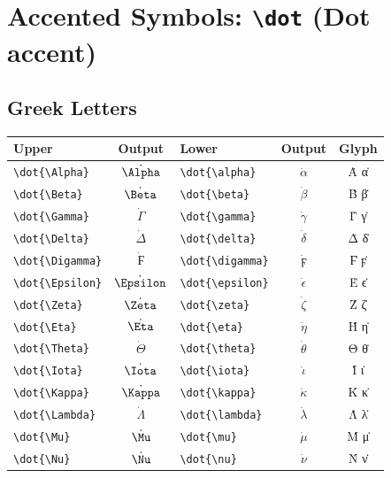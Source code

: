 \documentclass[12pt,a4paper]{article}
\begin{document}
\section*{Accented Symbols: \texttt{\textbackslash dot} (Dot accent)}

\subsection*{Greek Letters}
\begin{longtable}{|l|c|l|c|c|}
\hline
\textbf{Upper}           & \textbf{Output}  & \textbf{Lower}           & \textbf{Output}     & \textbf{Glyph} \\
\hline
\verb|\dot{\Alpha}|      & $\dot{\Alpha}$   & \verb|\dot{\alpha}|      & $\dot{\alpha}$      & Α̇ α̇ \\
\verb|\dot{\Beta}|       & $\dot{\Beta}$    & \verb|\dot{\beta}|       & $\dot{\beta}$       & Β̇ β̇ \\
\verb|\dot{\Gamma}|      & $\dot{\Gamma}$   & \verb|\dot{\gamma}|      & $\dot{\gamma}$      & Γ̇ γ̇ \\
\verb|\dot{\Delta}|      & $\dot{\Delta}$   & \verb|\dot{\delta}|      & $\dot{\delta}$      & Δ̇ δ̇ \\
\verb|\dot{\Digamma}|    & $\dot{\Digamma}$ & \verb|\dot{\digamma}|    & $\dot{\digamma}$    & Ϝ̇ ϝ̇ \\
\verb|\dot{\Epsilon}|    & $\dot{\Epsilon}$ & \verb|\dot{\epsilon}|    & $\dot{\epsilon}$    & Ε̇ ϵ̇ \\
\verb|\dot{\Zeta}|       & $\dot{\Zeta}$    & \verb|\dot{\zeta}|       & $\dot{\zeta}$       & Ζ̇ ζ̇ \\
\verb|\dot{\Eta}|        & $\dot{\Eta}$     & \verb|\dot{\eta}|        & $\dot{\eta}$        & Η̇ η̇ \\
\verb|\dot{\Theta}|      & $\dot{\Theta}$   & \verb|\dot{\theta}|      & $\dot{\theta}$      & Θ̇ θ̇ \\
\verb|\dot{\Iota}|       & $\dot{\Iota}$    & \verb|\dot{\iota}|       & $\dot{\iota}$       & Ι̇ ι̇ \\
\verb|\dot{\Kappa}|      & $\dot{\Kappa}$   & \verb|\dot{\kappa}|      & $\dot{\kappa}$      & Κ̇ κ̇ \\
\verb|\dot{\Lambda}|     & $\dot{\Lambda}$  & \verb|\dot{\lambda}|     & $\dot{\lambda}$     & Λ̇ λ̇ \\
\verb|\dot{\Mu}|         & $\dot{\Mu}$      & \verb|\dot{\mu}|         & $\dot{\mu}$         & Μ̇ μ̇ \\
\verb|\dot{\Nu}|         & $\dot{\Nu}$      & \verb|\dot{\nu}|         & $\dot{\nu}$         & Ν̇ ν̇ \\

\end{longtable}
\end{document}
